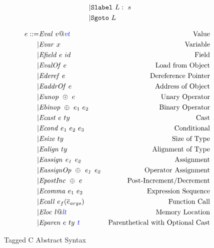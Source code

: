 \documentclass[acmsmall,review,anonymous]{acmart}\settopmatter{printfolios=true,printccs=false,printacmref=false}
\begin{document}
\begin{figure}
\begin{subfigure}[t]{0.3\textwidth}
\[\begin{aligned}
    | & \mathtt{Slabel} ~ L: ~ s \\
    | & \mathtt{Sgoto} ~ L \\    
    \end{aligned}\]
  \end{subfigure}
  \begin{subfigure}[t]{0.69\textwidth}
    \[\begin{aligned}
    e ::= & \mathit{Eval} ~ v@\mathit{\color{blue} vt} & \textnormal{Value} \\
    | & \mathit{Evar} ~ x & \textnormal{Variable} \\
    | & \mathit{Efield} ~ e ~ id & \textnormal{Field} \\
    | & \mathit{EvalOf} ~ e & \textnormal{Load from Object} \\
    | & \mathit{Ederef} ~ e & \textnormal{Dereference Pointer} \\
    | & \mathit{EaddrOf} ~ e & \textnormal{Address of Object} \\
    | & \mathit{Eunop} ~ \odot ~ e & \textnormal{Unary Operator} \\
    | & \mathit{Ebinop} ~ \oplus ~ e_1 ~ e_2 & \textnormal{Binary Operator} \\
    | & \mathit{Ecast} ~ e ~ ty & \textnormal{Cast} \\
    | & \mathit{Econd} ~ e_1 ~ e_2 ~ e_3 & \textnormal{Conditional} \\
    | & \mathit{Esize} ~ ty & \textnormal{Size of Type} \\
    | & \mathit{Ealign} ~ ty & \textnormal{Alignment of Type} \\
    | & \mathit{Eassign ~ e_1 ~ e_2} & \textnormal{Assignment} \\
    | & \mathit{EassignOp ~ \oplus ~ e_1 ~ e_2} & \textnormal{Operator Assignment} \\
    | & \mathit{EpostInc} ~ \oplus ~ e & \textnormal{Post-Increment/Decrement} \\
    | & \mathit{Ecomma} ~ e_1 ~ e_2 & \textnormal{Expression Sequence} \\
    | & \mathit{Ecall} ~ e_f(\overline{e}_{args}) & \textnormal{Function Call} \\
    | & \mathit{Eloc} ~ l@\mathit{\color{blue} lt} & \textnormal{Memory Location} \\
    | & \mathit{Eparen} ~ e ~ ty ~ \mathit{\color{blue} t} & \textnormal{Parenthetical with Optional Cast} \\
    \end{aligned}\]
  \end{subfigure}
  \caption{Tagged C Abstract Syntax}
  \label{fig:syntax}
\end{figure}
\end{document}
